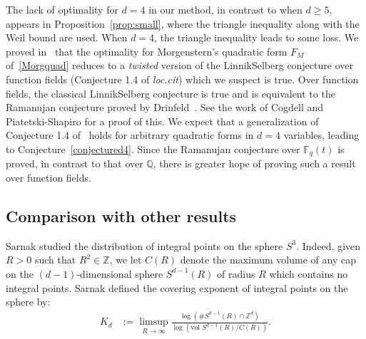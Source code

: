 \documentclass[10pt]{amsart}
\theoremstyle{plain}
\theoremstyle{plain}
\renewcommand{\vec}[1]{\mathbf{#1}}
\theoremstyle{remark}
\theoremstyle{definition}
\newcommand{\hQ}{\widehat{Q}}
\newcommand{\exc}{\textup{exc}}
\begin{document}
The lack of optimality for $d=4$ in our method, in contrast to when $d\geq 5$, appears in Proposition~\ref{prop:small}, where the triangle inequality along with the Weil bound are used. When $d=4$, the triangle inequality leads to some loss. We proved in~\cite{SZ2019} that the optimality for Morgenstern's quadratic form $F_M$ of~\eqref{Morgquad} reduces to a \textit{twisted} version of the Linnik\textendash Selberg conjecture over function fields (Conjecture 1.4 of \textit{loc.cit}) which we suspect is true.  Over function fields, the classical Linnik\textendash Selberg conjecture is true and is equivalent to the Ramanujan conjecture proved by Drinfeld~\cite{Drinfeld}. See the work of Cogdell and Piatetski-Shapiro \cite{CPS} for a proof of this. We expect that a generalization of Conjecture 1.4 of~\cite{SZ2019} holds for arbitrary quadratic forms in $d=4$ variables, leading to Conjecture~\ref{conjectured4}. Since the Ramanujan conjecture over $\mathbb{F}_q(t)$ is proved, in contrast to that over $\mathbb{Q}$, there is greater hope of proving such a result over function fields.
\subsection{Comparison with other  results}
Sarnak studied the distribution of integral points on the sphere $S^3$. Indeed, given $R>0$ such that $R^2\in \mathbb{Z}$, we let $C(R)$ denote the maximum volume  of any cap on  the $(d-1)$-dimensional sphere $S^{d-1}(R)$ of radius $R$ which contains no integral points. Sarnak defined  \cite{Sarnak2}
 the covering exponent of integral points on the sphere by:
 \begin{equation*}
 \begin{split}
 K_d&:=\limsup_{R \to \infty}\frac{\log \left(\# S^{d-1}(R)\cap \mathbb{Z}^d \right) }{\log\left( \text{vol } S^{d-1}(R)/C(R)\right)}.
 \end{split}
 \end{equation*}
 
\end{document}
